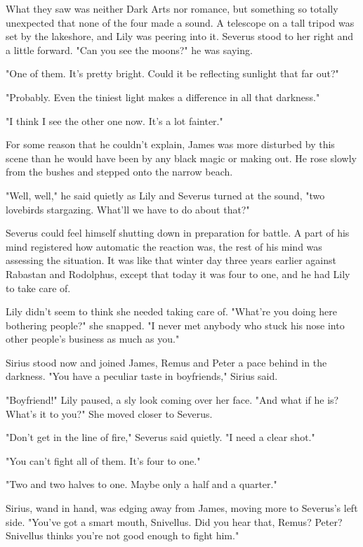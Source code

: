 \documentclass[a4paper,11pt]{article}
\begin{document}
What they saw was neither Dark Arts nor romance, but something so totally unexpected that none of the four made a sound. A telescope on a tall tripod was set by the lakeshore, and Lily was peering into it. Severus stood to her right and a little forward. "Can you see the moons?" he was saying.

"One of them. It's pretty bright. Could it be reflecting sunlight that far out?"

"Probably. Even the tiniest light makes a difference in all that darkness."

"I think I see the other one now. It's a lot fainter."

For some reason that he couldn't explain, James was more disturbed by this scene than he would have been by any black magic or making out. He rose slowly from the bushes and stepped onto the narrow beach.

"Well, well," he said quietly as Lily and Severus turned at the sound, "two lovebirds stargazing. What'll we have to do about that?"

Severus could feel himself shutting down in preparation for battle. A part of his mind registered how automatic the reaction was, the rest of his mind was assessing the situation. It was like that winter day three years earlier against Rabastan and Rodolphus, except that today it was four to one, and he had Lily to take care of.

Lily didn't seem to think she needed taking care of. "What're you doing here bothering people?" she snapped. "I never met anybody who stuck his nose into other people's business as much as you."

Sirius stood now and joined James, Remus and Peter a pace behind in the darkness. "You have a peculiar taste in boyfriends," Sirius said.

"Boyfriend!" Lily paused, a sly look coming over her face. "And what if he is? What's it to you?" She moved closer to Severus.

"Don't get in the line of fire," Severus said quietly. "I need a clear shot."

"You can't fight all of them. It's four to one."

"Two and two halves to one. Maybe only a half and a quarter."

Sirius, wand in hand, was edging away from James, moving more to Severus's left side. "You've got a smart mouth, Snivellus. Did you hear that, Remus? Peter? Snivellus thinks you're not good enough to fight him."
\end{document}
